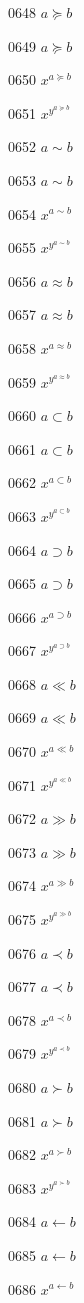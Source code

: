 \documentclass{article}
\begin{document}
0648 $a\succeq b$\par
0649 $\displaystyle a\succeq b$\par
0650 $x^{a\succeq b}$\par
0651 $x^{y^{a\succeq b}}$\par
0652 $a\sim b$\par
0653 $\displaystyle a\sim b$\par
0654 $x^{a\sim b}$\par
0655 $x^{y^{a\sim b}}$\par
0656 $a\approx b$\par
0657 $\displaystyle a\approx b$\par
0658 $x^{a\approx b}$\par
0659 $x^{y^{a\approx b}}$\par
0660 $a\subset b$\par
0661 $\displaystyle a\subset b$\par
0662 $x^{a\subset b}$\par
0663 $x^{y^{a\subset b}}$\par
0664 $a\supset b$\par
0665 $\displaystyle a\supset b$\par
0666 $x^{a\supset b}$\par
0667 $x^{y^{a\supset b}}$\par
0668 $a\ll b$\par
0669 $\displaystyle a\ll b$\par
0670 $x^{a\ll b}$\par
0671 $x^{y^{a\ll b}}$\par
0672 $a\gg b$\par
0673 $\displaystyle a\gg b$\par
0674 $x^{a\gg b}$\par
0675 $x^{y^{a\gg b}}$\par
0676 $a\prec b$\par
0677 $\displaystyle a\prec b$\par
0678 $x^{a\prec b}$\par
0679 $x^{y^{a\prec b}}$\par
0680 $a\succ b$\par
0681 $\displaystyle a\succ b$\par
0682 $x^{a\succ b}$\par
0683 $x^{y^{a\succ b}}$\par
0684 $a\gets b$\par
0685 $\displaystyle a\gets b$\par
0686 $x^{a\gets b}$\par
\end{document}
